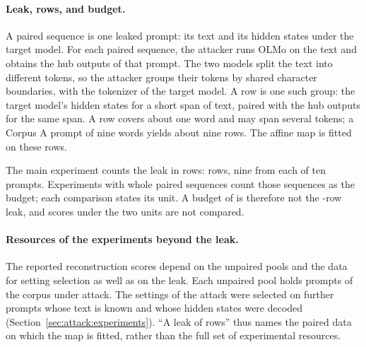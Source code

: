 \paragraph{Leak, rows, and budget.} A paired sequence is one leaked prompt: its text and its hidden states under the target model.
For each paired sequence, the attacker runs OLMo on the text and obtains the hub outputs of that prompt. %
The two models split the text into different tokens, so the attacker groups their tokens by shared character boundaries, with the tokenizer of the target model.
A row is one such group: the target model's hidden states for a short span of text, paired with the hub outputs for the same span.
A row covers about one word and may span several tokens; a Corpus A prompt of nine words yields about nine rows. %
The affine map is fitted on these rows.

The main experiment counts the leak in rows:  rows, nine from each of ten prompts.
Experiments with whole paired sequences count those sequences as the budget; each comparison states its unit.
A budget of  is therefore not the -row leak, and scores under the two units are not compared.

\paragraph{Resources of the experiments beyond the leak.} The reported reconstruction scores depend on the unpaired pools and the data for setting selection as well as on the leak.
Each unpaired pool holds  prompts of the corpus under attack. %
The settings of the attack were selected on  further prompts whose text is known and whose hidden states were decoded (Section~\ref{sec:attack:experiments}).
``A leak of  rows'' thus names the paired data on which the map is fitted, rather than the full set of experimental resources.
